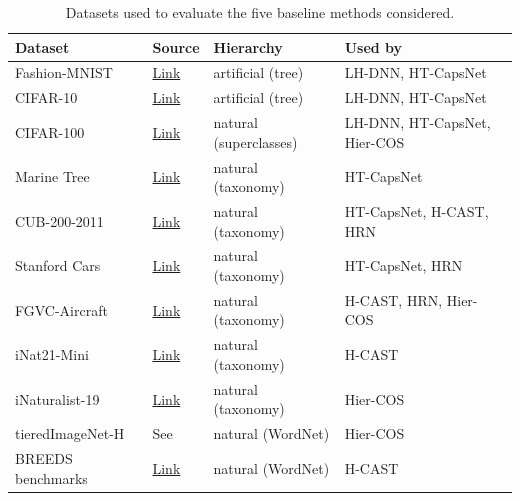 \begin{table}[!h]
\centering
\caption{Datasets used to evaluate the five baseline methods considered.}
\label{tab:datasets_hic}
\experimenttablesetup
\begin{tabularx}{\linewidth}{@{}L{2.7cm}L{1.6cm}L{3.4cm}Y@{}}
\toprule
\textbf{Dataset} & \textbf{Source} & \textbf{Hierarchy} & \textbf{Used by} \\
\midrule

Fashion-MNIST & \href{https://github.com/zalandoresearch/fashion-mnist}{Link} & artificial (tree) & LH-DNN, HT-CapsNet \\
\midrule

CIFAR-10 & \href{https://www.cs.toronto.edu/~kriz/cifar.html}{Link} & artificial (tree) & LH-DNN, HT-CapsNet \\
\midrule

CIFAR-100 & \href{https://www.cs.toronto.edu/~kriz/cifar.html}{Link} & natural (superclasses) & LH-DNN, HT-CapsNet, Hier-COS \\
\midrule

Marine Tree & \href{https://github.com/visipedia/marine-tree}{Link} & natural (taxonomy) & HT-CapsNet \\
\midrule

CUB-200-2011 & \href{https://www.vision.caltech.edu/datasets/cub_200_2011/}{Link} & natural (taxonomy) & HT-CapsNet, H-CAST, HRN \\
\midrule

Stanford Cars & \href{https://ai.stanford.edu/~jkrause/cars/car_dataset.html}{Link} & natural (taxonomy) & HT-CapsNet, HRN \\
\midrule

FGVC-Aircraft & \href{https://www.robots.ox.ac.uk/~vgg/data/fgvc-aircraft/}{Link} & natural (taxonomy) & H-CAST, HRN, Hier-COS \\
\midrule

iNat21-Mini & \href{https://github.com/visipedia/inat_comp/tree/master/2021}{Link} & natural (taxonomy) & H-CAST \\
\midrule

iNaturalist-19 & \href{https://github.com/visipedia/inat_comp/tree/master/2019}{Link} & natural (taxonomy) & Hier-COS \\
\midrule

tieredImageNet-H & See \cite{zeng2023learning} & natural (WordNet) & Hier-COS \\
\midrule

BREEDS benchmarks & \href{https://github.com/microsoft/robustness/tree/master/robustness/tools/breeds_helpers}{Link} & natural (WordNet) & H-CAST \\

\bottomrule
\end{tabularx}

\end{table}

